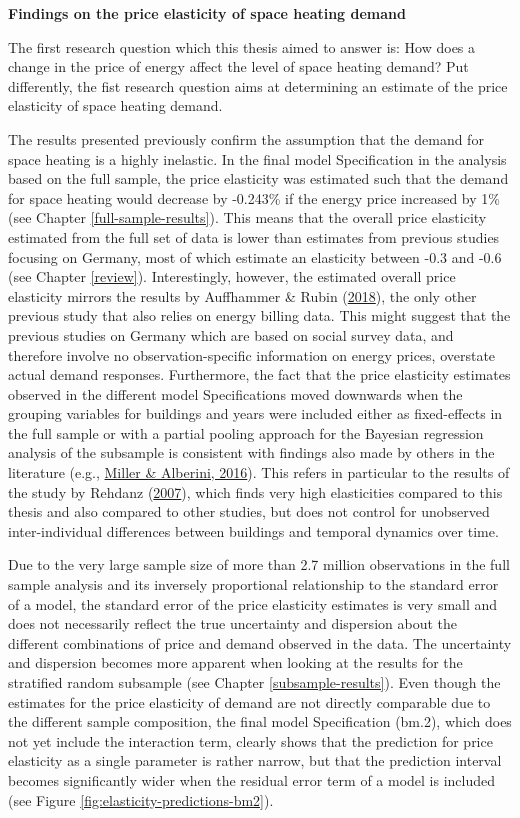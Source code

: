 \documentclass[12pt,twoside]{reedthesis}
\begin{document}
\textbf{Findings on the price elasticity of space heating demand}

The first research question which this thesis aimed to answer is: How does a change in the price of energy affect the level of space heating demand? Put differently, the fist research question aims at determining an estimate of the price elasticity of space heating demand.

The results presented previously confirm the assumption that the demand for space heating is a highly inelastic. In the final model Specification in the analysis based on the full sample, the price elasticity was estimated such that the demand for space heating would decrease by -0.243\% if the energy price increased by 1\% (see Chapter \ref{full-sample-results}). This means that the overall price elasticity estimated from the full set of data is lower than estimates from previous studies focusing on Germany, most of which estimate an elasticity between -0.3 and -0.6 (see Chapter \ref{review}). Interestingly, however, the estimated overall price elasticity mirrors the results by Auffhammer \& Rubin (\protect\hyperlink{ref-auffhammer_rubin18}{2018}), the only other previous study that also relies on energy billing data. This might suggest that the previous studies on Germany which are based on social survey data, and therefore involve no observation-specific information on energy prices, overstate actual demand responses. Furthermore, the fact that the price elasticity estimates observed in the different model Specifications moved downwards when the grouping variables for buildings and years were included either as fixed-effects in the full sample or with a partial pooling approach for the Bayesian regression analysis of the subsample is consistent with findings also made by others in the literature (e.g., \protect\hyperlink{ref-miller_alberini16}{Miller \& Alberini, 2016}). This refers in particular to the results of the study by Rehdanz (\protect\hyperlink{ref-rehdanz07}{2007}), which finds very high elasticities compared to this thesis and also compared to other studies, but does not control for unobserved inter-individual differences between buildings and temporal dynamics over time.

Due to the very large sample size of more than 2.7 million observations in the full sample analysis and its inversely proportional relationship to the standard error of a model, the standard error of the price elasticity estimates is very small and does not necessarily reflect the true uncertainty and dispersion about the different combinations of price and demand observed in the data. The uncertainty and dispersion becomes more apparent when looking at the results for the stratified random subsample (see Chapter \ref{subsample-results}). Even though the estimates for the price elasticity of demand are not directly comparable due to the different sample composition, the final model Specification (bm.2), which does not yet include the interaction term, clearly shows that the prediction for price elasticity as a single parameter is rather narrow, but that the prediction interval becomes significantly wider when the residual error term of a model is included (see Figure \ref{fig:elasticity-predictions-bm2}).
\end{document}
